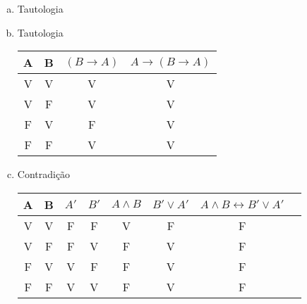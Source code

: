 \documentclass[a4paper, 12pt, addpoints]{exam}
\begin{document}
\begin{questions}
\begin{resp}
\begin{enumerate}[a)]
      \item Tautologia \\
      \item Tautologia \\
      \begin{tabular}{|c|c|c|c|}
        \hline
        A & B & $(B \rightarrow A)$ & $A \rightarrow (B \rightarrow A)$ \\
        \hline
        V & V & V & V \\
        V & F & V & V \\
        F & V & F & V \\
        F & F & V & V \\
        \hline
      \end{tabular}

      \item Contradição \\
      \begin{tabular}{|c|c|c|c|c|c|c|c|}
        \hline
        A & B & $A'$ & $B'$ & $A \land B$ & $B' \lor A'$ & $A \land B \leftrightarrow B' \lor A'$ \\
        \hline
        V & V & F & F & V & F & F \\
        V & F & F & V & F & V & F \\
        F & V & V & F & F & V & F \\
        F & F & V & V & F & V & F \\
        \hline
      \end{tabular}


\end{enumerate}
\end{resp}
\end{questions}
\end{document}
